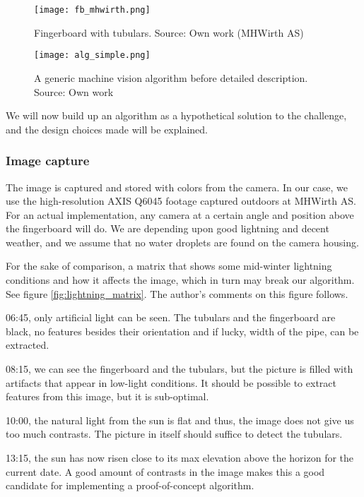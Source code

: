 \begin{figure}[ht]
    \centering
    \texttt{[image: fb\_mhwirth.png]}
    \caption{Fingerboard with tubulars. Source: Own work (MHWirth AS)}
    \label{fig:fb_mhwirth}
\end{figure}
\FloatBarrier

\begin{figure}[ht]
    \centering
    \texttt{[image: alg\_simple.png]}
    \caption{A generic machine vision algorithm before detailed description. Source: Own work}
    \label{fig:alg_simple}
\end{figure}
\FloatBarrier

We will now build up an algorithm as a hypothetical solution to the challenge, and the design choices made will be explained.

\subsubsection{Image capture}
The image is captured and stored with colors from the camera. In our case, we use the high-resolution AXIS Q6045 footage captured outdoors at MHWirth AS. For an actual implementation, any camera at a certain angle and position above the fingerboard will do. We are depending upon good lightning and decent weather, and we assume that no water droplets are found on the camera housing.

For the sake of comparison, a matrix that shows some mid-winter lightning conditions and how it affects the image, which in turn may break our algorithm. See figure \ref{fig:lightning_matrix}. The author's comments on this figure follows.

06:45, only artificial light can be seen. The tubulars and the fingerboard are black, no features besides their orientation and if lucky, width of the pipe, can be extracted.

08:15, we can see the fingerboard and the tubulars, but the picture is filled with artifacts that appear in low-light conditions. It should be possible to extract features from this image, but it is sub-optimal.

10:00, the natural light from the sun is flat and thus, the image does not give us too much contrasts. The picture in itself should suffice to detect the tubulars.

13:15, the sun has now risen close to its max elevation above the horizon for the current date. A good amount of contrasts in the image makes this a good candidate for implementing a proof-of-concept algorithm.

